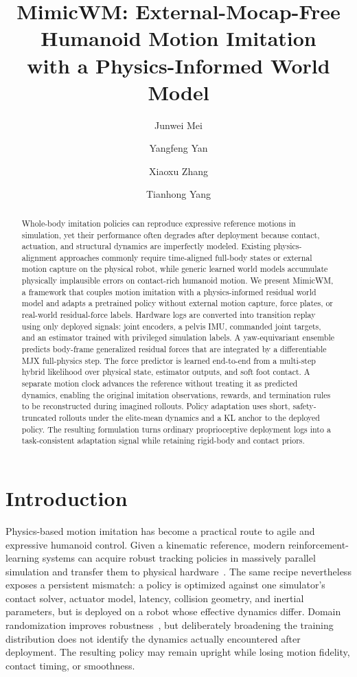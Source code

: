 \documentclass[10pt,twocolumn]{article}
\title{\textbf{MimicWM: External-Mocap-Free Humanoid Motion Imitation\\with a Physics-Informed World Model}}
\author{Junwei Mei \and Yangfeng Yan \and Xiaoxu Zhang \and Tianhong Yang}
\date{}
\newcommand{\method}{MimicWM}
\begin{document}
\maketitle

\begin{abstract}
Whole-body imitation policies can reproduce expressive reference motions in simulation, yet their performance often degrades after deployment because contact, actuation, and structural dynamics are imperfectly modeled. Existing physics-alignment approaches commonly require time-aligned full-body states or external motion capture on the physical robot, while generic learned world models accumulate physically implausible errors on contact-rich humanoid motion. We present \method{}, a framework that couples motion imitation with a physics-informed residual world model and adapts a pretrained policy without external motion capture, force plates, or real-world residual-force labels. Hardware logs are converted into transition replay using only deployed signals: joint encoders, a pelvis IMU, commanded joint targets, and an estimator trained with privileged simulation labels. A yaw-equivariant ensemble predicts body-frame generalized residual forces that are integrated by a differentiable MJX full-physics step. The force predictor is learned end-to-end from a multi-step hybrid likelihood over physical state, estimator outputs, and soft foot contact. A separate motion clock advances the reference without treating it as predicted dynamics, enabling the original imitation observations, rewards, and termination rules to be reconstructed during imagined rollouts. Policy adaptation uses short, safety-truncated rollouts under the elite-mean dynamics and a KL anchor to the deployed policy. The resulting formulation turns ordinary proprioceptive deployment logs into a task-consistent adaptation signal while retaining rigid-body and contact priors.
\end{abstract}

\section{Introduction}
\label{sec:introduction}

Physics-based motion imitation has become a practical route to agile and expressive humanoid control. Given a kinematic reference, modern reinforcement-learning systems can acquire robust tracking policies in massively parallel simulation and transfer them to physical hardware~\cite{peng2018deepmimic,peng2021amp,rudin2022learning,gu2024humanoidgym}. The same recipe nevertheless exposes a persistent mismatch: a policy is optimized against one simulator's contact solver, actuator model, latency, collision geometry, and inertial parameters, but is deployed on a robot whose effective dynamics differ. Domain randomization improves robustness~\cite{tobin2017domain,peng2018dynamics}, but deliberately broadening the training distribution does not identify the dynamics actually encountered after deployment. The resulting policy may remain upright while losing motion fidelity, contact timing, or smoothness.
\end{document}
